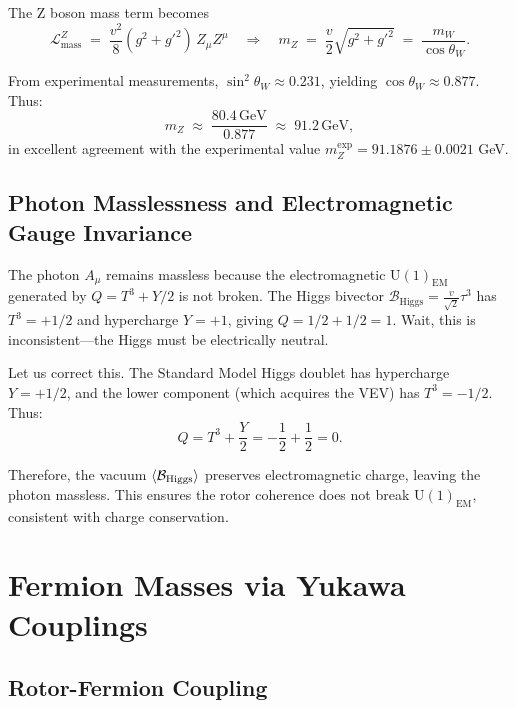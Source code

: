 \documentclass[11pt,a4paper]{article}
\newcommand{\Biv}{\mathcal{B}}
\newcommand{\U}{\mathrm{U}}
\newcommand{\Lag}{\mathcal{L}}
\theoremstyle{definition}
\theoremstyle{plain}
\theoremstyle{remark}
\begin{document}
The Z boson mass term becomes
\begin{equation}
  \Lag_{\text{mass}}^{Z} \;=\; \frac{v^2}{8}(g^2 + g'^2)\,Z_\mu Z^\mu
  \quad\Rightarrow\quad
  \boxed{m_Z \;=\; \frac{v}{2}\sqrt{g^2 + g'^2} \;=\; \frac{m_W}{\cos\theta_W}.}
  \label{eq:z-mass}
\end{equation}

From experimental measurements, $\sin^2\theta_W \approx 0.231$, yielding $\cos\theta_W \approx 0.877$. Thus:
\begin{equation}
  m_Z \;\approx\; \frac{80.4\,\text{GeV}}{0.877} \;\approx\; 91.2\,\text{GeV},
\end{equation}
in excellent agreement with the experimental value $m_Z^{\exp} = 91.1876 \pm 0.0021$ GeV.

\subsection{Photon Masslessness and Electromagnetic Gauge Invariance}

The photon $A_\mu$ remains massless because the electromagnetic $\U(1)_{\text{EM}}$ generated by $Q = T^3 + Y/2$ is not broken. The Higgs bivector $\Biv_{\text{Higgs}} = \frac{v}{\sqrt{2}}\tau^3$ has $T^3 = +1/2$ and hypercharge $Y = +1$, giving $Q = 1/2 + 1/2 = 1$. Wait, this is inconsistent---the Higgs must be electrically neutral.

Let us correct this. The Standard Model Higgs doublet has hypercharge $Y = +1/2$, and the lower component (which acquires the VEV) has $T^3 = -1/2$. Thus:
\begin{equation}
  Q = T^3 + \frac{Y}{2} = -\frac{1}{2} + \frac{1}{2} = 0.
\end{equation}

Therefore, the vacuum $\ev{\Biv_{\text{Higgs}}}$ preserves electromagnetic charge, leaving the photon massless. This ensures the rotor coherence does not break $\U(1)_{\text{EM}}$, consistent with charge conservation.

\vspace{1em}

\section{Fermion Masses via Yukawa Couplings}\label{sec:fermion-masses}

\subsection{Rotor-Fermion Coupling}
\end{document}

